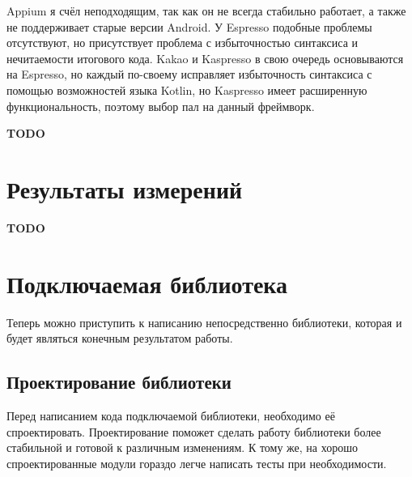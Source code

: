 \documentclass[a4paper,14pt]{extarticle} %
\begin{document}
	Appium я счёл неподходящим, так как он не всегда стабильно работает, а также не поддерживает старые версии Android. У Espresso подобные проблемы отсутствуют, но присутствует проблема с избыточностью синтаксиса и нечитаемости итогового кода. Kakao и Kaspresso в свою очередь основываются на Espresso, но каждый по-своему исправляет избыточность синтаксиса с помощью возможностей языка Kotlin, но Kaspresso имеет расширенную функциональность, поэтому выбор пал на данный фреймворк.
	
	\textbf{\Huge TODO}
	
	\newpage
	\section{Результаты измерений}
	
	\textbf{\Huge TODO}
	
	\newpage
	\section{Подключаемая библиотека}
	
	Теперь можно приступить к написанию непосредственно библиотеки, которая и будет являться конечным результатом работы.
	
	\subsection{Проектирование библиотеки}
	
	Перед написанием кода подключаемой библиотеки, необходимо её спроектировать. Проектирование поможет сделать работу библиотеки более стабильной и готовой к различным изменениям. К тому же, на хорошо спроектированные модули гораздо легче написать тесты при необходимости. 
	
\end{document}
